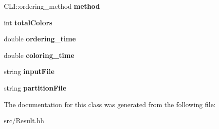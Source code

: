 \begin{DoxyCompactItemize}
\item 
\hypertarget{classResult_a3d24ec89902e66df00154915fc40f24b}{
CLI::ordering\_\-method {\bfseries method}}
\label{classResult_a3d24ec89902e66df00154915fc40f24b}

\item 
\hypertarget{classResult_ab3fb3b1917106d9d8b5a41c4bd62fae6}{
int {\bfseries totalColors}}
\label{classResult_ab3fb3b1917106d9d8b5a41c4bd62fae6}

\item 
\hypertarget{classResult_a67815d21a6795ee76113c6894c1a097d}{
double {\bfseries ordering\_\-time}}
\label{classResult_a67815d21a6795ee76113c6894c1a097d}

\item 
\hypertarget{classResult_ae70ae8efb6a22efc0f69ca93d2d5f8e9}{
double {\bfseries coloring\_\-time}}
\label{classResult_ae70ae8efb6a22efc0f69ca93d2d5f8e9}

\item 
\hypertarget{classResult_a5670324c2b7ea794e4ebc68035511f6e}{
string {\bfseries inputFile}}
\label{classResult_a5670324c2b7ea794e4ebc68035511f6e}

\item 
\hypertarget{classResult_ad32c047d13f46b4bf1c004e6fb1edb69}{
string {\bfseries partitionFile}}
\label{classResult_ad32c047d13f46b4bf1c004e6fb1edb69}

\end{DoxyCompactItemize}


The documentation for this class was generated from the following file:\begin{DoxyCompactItemize}
\item 
src/Result.hh\end{DoxyCompactItemize}
